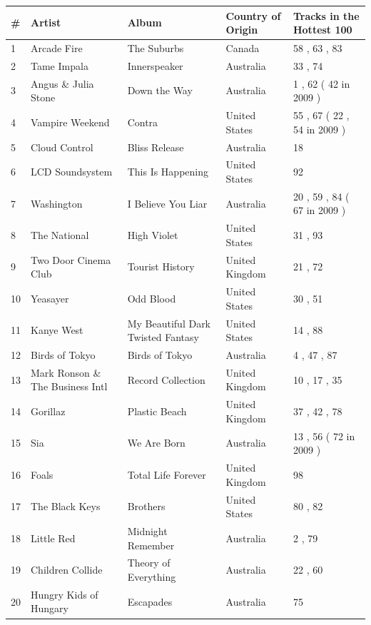 \documentclass{article}
\begin{document}
\begin{tabular}{lllll}
\toprule
\# & Artist & Album & Country of Origin & Tracks in the Hottest 100 \\
\midrule
1 & Arcade Fire & The Suburbs & Canada & 58 , 63 , 83 \\
2 & Tame Impala & Innerspeaker & Australia & 33 , 74 \\
3 & Angus \& Julia Stone & Down the Way & Australia & 1 , 62 ( 42 in 2009 ) \\
4 & Vampire Weekend & Contra & United States & 55 , 67 ( 22 , 54 in 2009 ) \\
5 & Cloud Control & Bliss Release & Australia & 18 \\
6 & LCD Soundsystem & This Is Happening & United States & 92 \\
7 & Washington & I Believe You Liar & Australia & 20 , 59 , 84 ( 67 in 2009 ) \\
8 & The National & High Violet & United States & 31 , 93 \\
9 & Two Door Cinema Club & Tourist History & United Kingdom & 21 , 72 \\
10 & Yeasayer & Odd Blood & United States & 30 , 51 \\
11 & Kanye West & My Beautiful Dark Twisted Fantasy & United States & 14 , 88 \\
12 & Birds of Tokyo & Birds of Tokyo & Australia & 4 , 47 , 87 \\
13 & Mark Ronson \& The Business Intl & Record Collection & United Kingdom & 10 , 17 , 35 \\
14 & Gorillaz & Plastic Beach & United Kingdom & 37 , 42 , 78 \\
15 & Sia & We Are Born & Australia & 13 , 56 ( 72 in 2009 ) \\
16 & Foals & Total Life Forever & United Kingdom & 98 \\
17 & The Black Keys & Brothers & United States & 80 , 82 \\
18 & Little Red & Midnight Remember & Australia & 2 , 79 \\
19 & Children Collide & Theory of Everything & Australia & 22 , 60 \\
20 & Hungry Kids of Hungary & Escapades & Australia & 75 \\
\bottomrule
\end{tabular}
\end{document}
